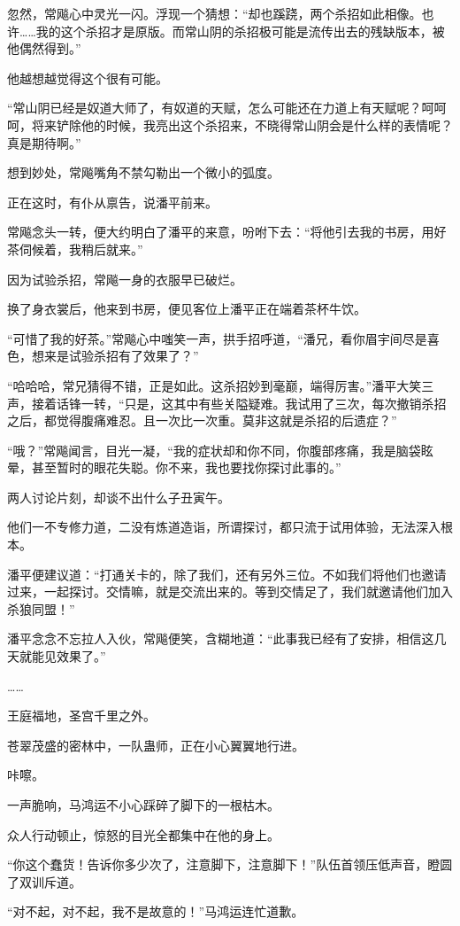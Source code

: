 \begin{this_body}
忽然，常飚心中灵光一闪。浮现一个猜想：“却也蹊跷，两个杀招如此相像。也许……我的这个杀招才是原版。而常山阴的杀招极可能是流传出去的残缺版本，被他偶然得到。”

他越想越觉得这个很有可能。

“常山阴已经是奴道大师了，有奴道的天赋，怎么可能还在力道上有天赋呢？呵呵呵，将来铲除他的时候，我亮出这个杀招来，不晓得常山阴会是什么样的表情呢？真是期待啊。”

想到妙处，常飚嘴角不禁勾勒出一个微小的弧度。

正在这时，有仆从禀告，说潘平前来。

常飚念头一转，便大约明白了潘平的来意，吩咐下去：“将他引去我的书房，用好茶伺候着，我稍后就来。”

因为试验杀招，常飚一身的衣服早已破烂。

换了身衣裳后，他来到书房，便见客位上潘平正在端着茶杯牛饮。

“可惜了我的好茶。”常飚心中嗤笑一声，拱手招呼道，“潘兄，看你眉宇间尽是喜色，想来是试验杀招有了效果了？”

“哈哈哈，常兄猜得不错，正是如此。这杀招妙到毫巅，端得厉害。”潘平大笑三声，接着话锋一转，“只是，这其中有些关隘疑难。我试用了三次，每次撤销杀招之后，都觉得腹痛难忍。且一次比一次重。莫非这就是杀招的后遗症？”

“哦？”常飚闻言，目光一凝，“我的症状却和你不同，你腹部疼痛，我是脑袋眩晕，甚至暂时的眼花失聪。你不来，我也要找你探讨此事的。”

两人讨论片刻，却谈不出什么子丑寅午。

他们一不专修力道，二没有炼道造诣，所谓探讨，都只流于试用体验，无法深入根本。

潘平便建议道：“打通关卡的，除了我们，还有另外三位。不如我们将他们也邀请过来，一起探讨。交情嘛，就是交流出来的。等到交情足了，我们就邀请他们加入杀狼同盟！”

潘平念念不忘拉人入伙，常飚便笑，含糊地道：“此事我已经有了安排，相信这几天就能见效果了。”

……

王庭福地，圣宫千里之外。

苍翠茂盛的密林中，一队蛊师，正在小心翼翼地行进。

咔嚓。

一声脆响，马鸿运不小心踩碎了脚下的一根枯木。

众人行动顿止，惊怒的目光全都集中在他的身上。

“你这个蠢货！告诉你多少次了，注意脚下，注意脚下！”队伍首领压低声音，瞪圆了双训斥道。

“对不起，对不起，我不是故意的！”马鸿运连忙道歉。


\end{this_body}
